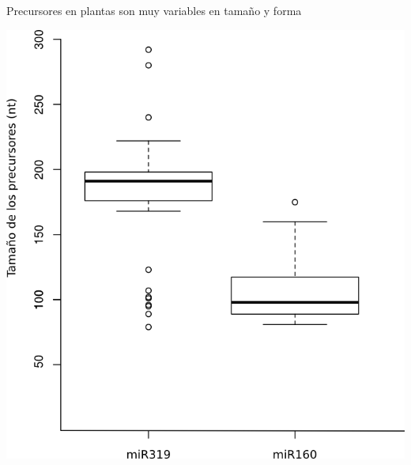 \documentclass{beamer}
\begin{document}

\begin{frame}{Precursores en plantas son muy variables en tamaño y forma}
	\begin{center}
		\includegraphics[width=.5\textwidth]{img/hairpin_distribution.png}
	\end{center}
\end{frame}
\end{document}
